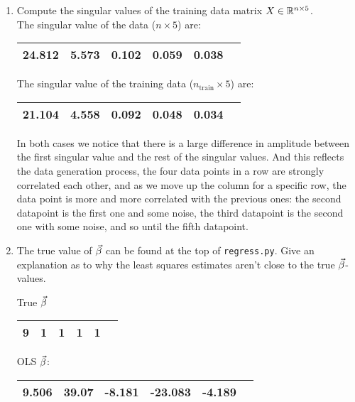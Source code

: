 \documentclass[12pt,twoside]{article}
\begin{document}
\begin{enumerate}
\begin{enumerate}
  \item Compute the singular values of the training data matrix
    $X\in\mathbb{R}^{n\times 5}$.\\
    
   The singular value of the data ($n \times 5$) are:
   \begin{center}
    		\begin{tabular}{ | c | c | c | c | c | c | }
		\hline
			24.812 & 5.573 & 0.102 & 0.059 & 0.038\\ 
		\hline
    	\end{tabular}
    \end{center}
    
   The singular value of the training data ($n_\text{train} \times 5$) are: 
   \begin{center}
    		\begin{tabular}{ | c | c | c | c | c | c | }
		\hline
			21.104 & 4.558 & 0.092 & 0.048 &  0.034\\ 
		\hline
    	\end{tabular}
    \end{center}

In both cases we notice that there is a large difference in amplitude between the first singular value and the rest of the singular values.
And this reflects the data generation process, the four data points in a row are strongly correlated each other, and as we move up the column for a specific row, 
the data point is more and more correlated with the previous ones:
the second datapoint is the first one and some noise, the third datapoint is the second one with some noise, and so until the fifth datapoint.

  \item The true value of $\vec{\beta}$ can be found at the top of
    \verb|regress.py|.  Give an explanation as to why the least squares
    estimates aren't close to the true $\vec{\beta}$-values.
    
   True $\vec{\beta}$
   \begin{center}
    		\begin{tabular}{ | c | c | c | c | c | c | }
		\hline
			9 & 1 & 1 & 1 &  1\\ 
		\hline
    	\end{tabular}
    \end{center}

  OLS $\vec{\beta}$:
   \begin{center}
    		\begin{tabular}{ | c | c | c | c | c | c | }
		\hline
			9.506 & 39.07 & -8.181 & -23.083 &  -4.189\\ 
		\hline
    	\end{tabular}
    \end{center}


\end{enumerate}
\end{enumerate}
\end{document}
